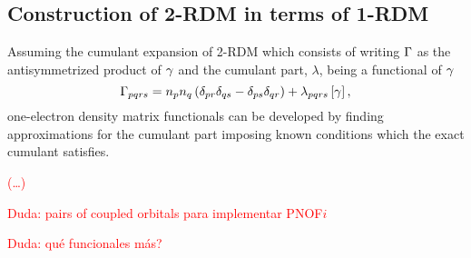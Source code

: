 \subsection{Construction of 2-RDM in terms of 1-RDM}


Assuming the cumulant expansion of 2-RDM which
consists of writing $\Gamma$ as the antisymmetrized product of $\gamma$ and
the cumulant part, $\lambda$, being a functional of $\gamma$ 
\begin{equation}
    \Gamma_{pqrs} =
    n_p n_q \left( \delta_{pr} \delta_{qs} - \delta_{ps} \delta_{qr} \right)
    + \lambda_{pqrs} \left[ \gamma \right]
    ,
\end{equation}
one-electron density matrix functionals can be developed by finding
approximations for the cumulant part imposing known conditions which the exact
cumulant satisfies.

\textcolor{red}{(\ldots)}

\textcolor{red}{Duda: pairs of coupled orbitals para implementar PNOF$i$}

\textcolor{red}{Duda: qué funcionales más?}

